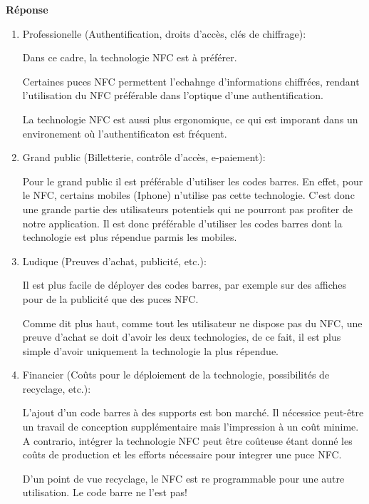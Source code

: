 \documentclass[a4paper]{article}
\begin{document}
\begin{enumerate}
    \textbf{Réponse} \\
	\begin{enumerate}

\item
Professionelle (Authentification, droits d’accès, clés de chiffrage):

Dans ce cadre, la technologie NFC est à préférer.

Certaines puces NFC permettent l'echahnge d'informations chiffrées, rendant l'utilisation du NFC préférable dans l'optique d'une authentification.

La technologie NFC est aussi plus ergonomique, ce qui est imporant dans un environement où l'authentificaton est fréquent.




\item
Grand public (Billetterie, contrôle d’accès, e-paiement):

Pour le grand public il est préférable d'utiliser les codes barres. En effet, pour le NFC, certains mobiles (Iphone) n'utilise pas cette technologie. C'est donc une grande partie des utilisateurs potentiels qui ne pourront pas profiter de notre application. Il est donc préférable d'utiliser les codes barres dont la technologie est plus répendue parmis les mobiles.

\item
Ludique (Preuves d'achat, publicité, etc.):

Il est plus facile de déployer des codes barres, par exemple sur des affiches pour de la publicité que des puces NFC.

Comme dit plus haut, comme tout les utilisateur ne dispose pas du NFC, une preuve d'achat se doit d'avoir les deux technologies, de ce fait, il est plus simple d'avoir uniquement la technologie la plus répendue.

\item
Financier (Coûts pour le déploiement de la technologie, possibilités de recyclage, etc.):

L'ajout d'un code barres à des supports est bon marché. Il nécessice peut-être un travail de conception supplémentaire mais l'impression à un coût minime.
A contrario, intégrer la technologie NFC peut être coûteuse étant donné les coûts de production et les efforts nécessaire pour integrer une puce NFC.


D'un point de vue recyclage, le NFC est re programmable pour une autre utilisation. Le code barre ne l'est pas!
   \end{enumerate}
    

\end{enumerate}
\end{document}
